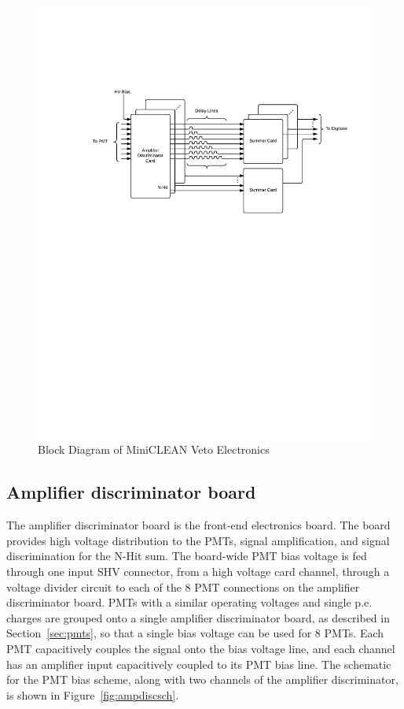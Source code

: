 \documentclass[review,number,sort&compress]{elsarticle}
\begin{document}
\begin{figure}[ht]
\begin{center}
\includegraphics[width=5in, keepaspectratio=true, trim=1.25in 5.75in 0.5in 2in, clip=true]{graphics/block.pdf}
\caption{Block Diagram of MiniCLEAN Veto Electronics
\label{fig:block_diagram}}
\end{center}
\end{figure}

\subsection{Amplifier discriminator board}
\label{sec:Amp-Disc}
%
The amplifier discriminator board is the front-end electronics board.
The board provides high voltage distribution to the PMTs, signal
amplification, and signal discrimination for the N-Hit sum. The
board-wide PMT bias voltage is fed through one input SHV connector,
from a high voltage card channel, through a voltage divider circuit to
each of the 8 PMT connections on the amplifier discriminator board.
PMTs with a similar operating voltages and single p.e. charges are
grouped onto a single amplifier discriminator board, as described in
Section~\ref{sec:pmts}, so that a single bias voltage can be used for
8 PMTs. Each PMT capacitively couples the signal onto the bias voltage
line, and each channel has an amplifier input capacitively coupled to
its PMT bias line. The schematic for the PMT bias scheme, along with
two channels of the amplifier discriminator, is shown in
Figure~\ref{fig:ampdiscsch}.
\end{document}
